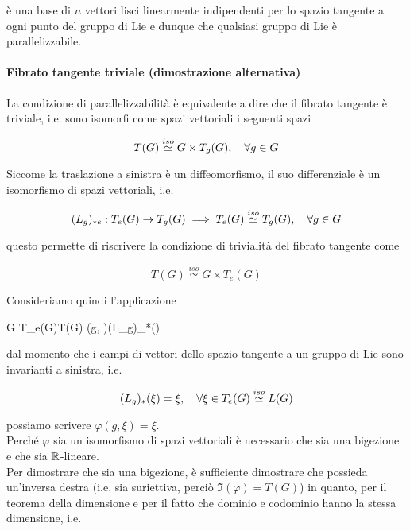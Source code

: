 {è una base di $ n $ vettori lisci linearmente indipendenti per lo spazio tangente a ogni punto del gruppo di Lie e dunque che qualsiasi gruppo di Lie è parallelizzabile.

\paragraph{Fibrato tangente triviale (dimostrazione alternativa)}


La condizione di parallelizzabilità è equivalente a dire che il fibrato tangente è triviale, i.e. sono isomorfi come spazi vettoriali i seguenti spazi

\begin{equation}
	T(G) \stackrel{iso}{\simeq} G \times T_{g}(G) \qcomma \forall g \in G
\end{equation}

Siccome la traslazione a sinistra è un diffeomorfismo, il suo differenziale è un isomorfismo di spazi vettoriali, i.e.

\begin{equation}
	(L_{g})_{*e} : T_{e}(G) \to T_{g}(G) %
	\implies %
	T_{e}(G) \stackrel{iso}{\simeq} T_{g}(G) \qcomma \forall g \in G
\end{equation}

questo permette di riscrivere la condizione di trivialità del fibrato tangente come

\begin{equation}
	T(G) \stackrel{iso}{\simeq} G \times T_{e}(G)
\end{equation}

Consideriamo quindi l'applicazione

\map{\varphi}
	{G \times T_{e}(G)}{T(G)}
	{(g, \xi)}{(L_{g})_{*}(\xi)}

dal momento che i campi di vettori dello spazio tangente a un gruppo di Lie sono invarianti a sinistra, i.e.

\begin{equation}
	(L_{g})_{*}(\xi) = \xi \qcomma \forall \xi \in T_{e}(G) \stackrel{iso}{\simeq} L(G)
\end{equation}

possiamo scrivere $ \varphi(g, \xi) = \xi $. \\
Perché $ \varphi $ sia un isomorfismo di spazi vettoriali è necessario che sia una bigezione e che sia $ \mathbb{R} $-lineare. \\
Per dimostrare che sia una bigezione, è sufficiente dimostrare che possieda un'inversa destra (i.e. sia suriettiva, perciò $ \Im(\varphi) = T(G) $) in quanto, per il teorema della dimensione e per il fatto che dominio e codominio hanno la stessa dimensione, i.e.

}
